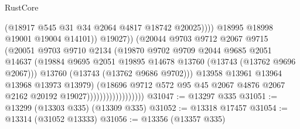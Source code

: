 \begin{lexlean}{RustCore}
\begin{coremodule}
                                                  (@18917 @545 @31 @34 @2064 @4817 @18742 @20025))))
                                            @18995
                                            @18998
                                            @19001
                                            @19004
                                            @14101))
                                        @19027))
                                    (@20044
                                      @9703
                                      @9712
                                      @2067
                                      @9715
                                      (@20051
                                        @9703
                                        @9710
                                        @2134
                                        (@19870
                                          @9702
                                          @9709
                                          @2044
                                          @9685
                                          @2051
                                          @14637
                                          (@19884
                                            @9695
                                            @2051
                                            @19895
                                            @14678
                                            @13760
                                            (@13743 (@13762 @9696 @2067)))
                                          @13760
                                          (@13743 (@13762 @9686 @9702)))
                                        @13958
                                        @13961
                                        @13964
                                        @13968
                                        @13973
                                        @13979)
                                      (@18696
                                        @9712
                                        @572
                                        @95
                                        @45
                                        @2067
                                        @4876
                                        @2067
                                        @2162
                                        @20192
                                        @19027))))))))))))))))))
@31047 := @13297 @335
@31051 := @13299 (@13303 @335) (@13309 @335)
@31052 := @13318 @17457
@31054 := @13314 (@31052 @13333)
@31056 := @13356 (@13357 @335)

\end{coremodule}
\end{lexlean}
